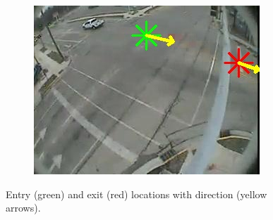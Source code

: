 \begin{figure}
\begin{subfigure}{0.32\linewidth}
            \includegraphics[width=\linewidth]{./img/scene_learning/res/intersection_4/intersection_4-10.jpg}
        \end{subfigure}
        \caption{Entry (green) and exit (red) locations with direction (yellow arrows).}
        \label{fig:entry-exit-full-2}
\end{figure}

